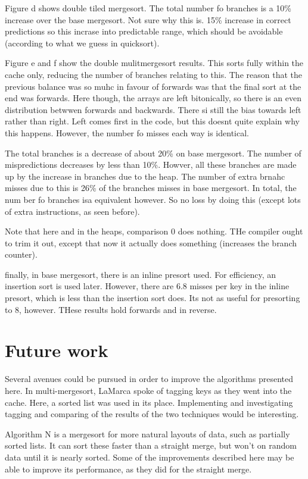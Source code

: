Figure d shows double tiled mergesort. The total number fo branches is a 10\% increase over the base mergesort. Not sure why this is. 15\% increase in correct predictions so this incrase into predictable range, which should be avoidable (according to what we guess in quicksort).

Figure e and f show the double mulitmergesort results. This sorts fully within the cache only, reducing the number of branches relating to this. The reason that the previous balance was so muhc in favour of forwards was that the final sort at the end was forwards. Here though, the arrays are left bitonically, so there is an even distribution betwwen forwards and backwards. There si still the bias towards left rather than right. Left comes first in the code, but this doesnt quite explain why this happens. However, the number fo misses each way is identical.

The total branches is a decrease of about 20\% on base mergesort. The number of mispredictions decreases by less than 10\%. Howver, all these branches are made up by the increase in branches due to the heap. The number of extra brnahc misses due to this is 26\% of the branches misses in base mergesort. In total, the num ber fo branches isa equivalent however. So no loss by doing this (except lots of extra instructions, as seen before).

Note that here and in the heaps, comparison 0 does nothing. THe compiler ought to trim it out, except that now it actually does something (increases the branch counter).


finally, in base mergesort, there is an inline presort used. For efficiency, an insertion sort is used later. However, there are 6.8 misses per key in the inline presort, which is less than the insertion sort does. Its not as useful for presorting to 8, however. THese results hold forwards and in reverse.



\section{Future work}
Several avenues could be pursued in order to improve the algorithms presented
here. In multi-mergesort, LaMarca spoke of tagging keys as they went into the
cache. Here, a sorted list was used in its place. Implementing and investigating
tagging and comparing of the results of the two techniques would be interesting.

Algorithm N is a mergesort for more natural layouts of data, such as partially
sorted lists. It can sort these faster than a straight merge, but won't on
random data until it is nearly sorted. Some of the improvements described here
may be able to improve its performance, as they did for the straight merge.

